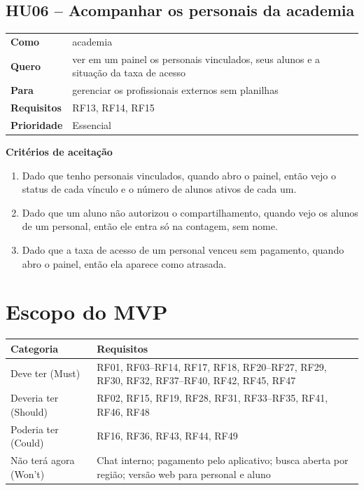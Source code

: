 \subsection*{HU06 -- Acompanhar os personais da academia}

\begin{tabularx}{\textwidth}{@{}l L@{}}
  \toprule
  \textbf{Como}       & academia \\
  \textbf{Quero}      & ver em um painel os personais vinculados, seus alunos e a situação da taxa de acesso \\
  \textbf{Para}       & gerenciar os profissionais externos sem planilhas \\
  \textbf{Requisitos} & RF13, RF14, RF15 \\
  \textbf{Prioridade} & Essencial \\
  \bottomrule
\end{tabularx}

\textbf{Critérios de aceitação}
\begin{enumerate}
  \item Dado que tenho personais vinculados, quando abro o painel, então vejo o status de cada vínculo e o número de alunos ativos de cada um.
  \item Dado que um aluno não autorizou o compartilhamento, quando vejo os alunos de um personal, então ele entra só na contagem, sem nome.
  \item Dado que a taxa de acesso de um personal venceu sem pagamento, quando abro o painel, então ela aparece como atrasada.
\end{enumerate}

\section{Escopo do MVP}

\begin{tabularx}{\textwidth}{@{}l L@{}}
  \toprule
  \textbf{Categoria} & \textbf{Requisitos} \\
  \midrule
  Deve ter (Must)        & RF01, RF03--RF14, RF17, RF18, RF20--RF27, RF29, RF30, RF32, RF37--RF40, RF42, RF45, RF47 \\
  Deveria ter (Should)   & RF02, RF15, RF19, RF28, RF31, RF33--RF35, RF41, RF46, RF48 \\
  Poderia ter (Could)    & RF16, RF36, RF43, RF44, RF49 \\
  Não terá agora (Won't) & Chat interno; pagamento pelo aplicativo; busca aberta por região; versão web para personal e aluno \\
  \bottomrule
\end{tabularx}

